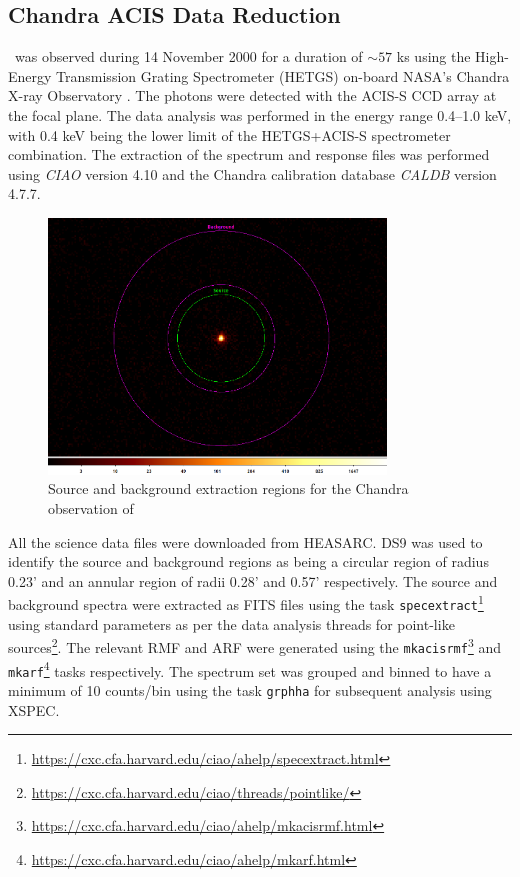     	\subsection{Chandra ACIS Data Reduction} \label{multi-obs:red-analysis:acis}
    		\source\ was observed during 14 November 2000 for a duration of $\sim 57$ ks using the High-Energy Transmission Grating Spectrometer (HETGS) on-board NASA's Chandra X-ray Observatory \cite{beardaChandra2002AA}. The photons were detected with the ACIS-S CCD array at the focal plane. The data analysis was performed in the energy range 0.4--1.0 keV, with 0.4 keV being the lower limit of the HETGS+ACIS-S spectrometer combination. The extraction of the spectrum and response files was performed using \textit{CIAO} version 4.10 and the Chandra calibration database \textit{CALDB} version 4.7.7.
	    	\begin{figure}[!htb]
		        \centering
		        \includegraphics[width=0.8\textwidth]{images/rx-j0925-7-4758_644_src-bkg.png}
		        \caption{Source and background extraction regions for the Chandra observation of \source}
		        \label{fig:src-bkg:acis}
		    \end{figure}
	    	
	    	All the science data files were downloaded from HEASARC. DS9 was used to identify the source and background regions as being a circular region of radius 0.23' and an annular region of radii 0.28' and 0.57' respectively. The source and background spectra were extracted as FITS files using the task \texttt{specextract}\footnote{\url{https://cxc.cfa.harvard.edu/ciao/ahelp/specextract.html}} using standard parameters as per the data analysis threads for point-like sources\footnote{\url{https://cxc.cfa.harvard.edu/ciao/threads/pointlike/}}. The relevant RMF and ARF were generated using the \texttt{mkacisrmf}\footnote{\url{https://cxc.cfa.harvard.edu/ciao/ahelp/mkacisrmf.html}} and \texttt{mkarf}\footnote{\url{https://cxc.cfa.harvard.edu/ciao/ahelp/mkarf.html}} tasks respectively. The spectrum set was grouped and binned to have a minimum of 10 counts/bin using the task \texttt{grphha} for subsequent analysis using XSPEC.
	    	
